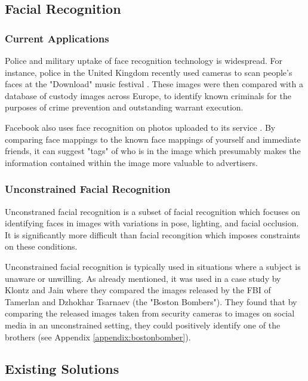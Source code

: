 \documentclass[12pt]{article}
\begin{document}
\subsection{Facial Recognition}
\subsubsection{Current Applications}
Police and military uptake of face recognition technology is widespread. For instance, police in the United Kingdom recently used cameras to scan people's faces at the "Download" music festival \citep{policefacerecog}. These images were then compared with a database of custody images across Europe, to identify known criminals for the purposes of crime prevention and outstanding warrant execution.

Facebook also uses face recognition on photos uploaded to its service \citep{facebookfacerecog}. By comparing face mappings to the known face mappings of yourself and immediate friends, it can suggest "tags" of who is in the image which presumably makes the information contained within the image more valuable to advertisers.

\subsubsection{Unconstrained Facial Recognition}
Unconstraned facial recognition is a subset of facial recognition which focuses on identifying faces in images with variations in pose, lighting, and facial occlusion. It is significantly more difficult than facial recongition which imposes constraints on these conditions.

Unconstrained facial recognition is typically used in situations where a subject is unaware or unwilling. As already mentioned, it was used in a case study by Klontz and Jain where they compared the images released by the FBI of Tamerlan and Dzhokhar Tsarnaev (the "Boston Bombers"). They found that by comparing the released images taken from security cameras to images on social media in an unconstrained setting, they could positively identify one of the brothers \citep{bostonbombingcasestudy} (see Appendix \ref{appendix:bostonbomber}).

\subsection{Existing Solutions}
\end{document}

